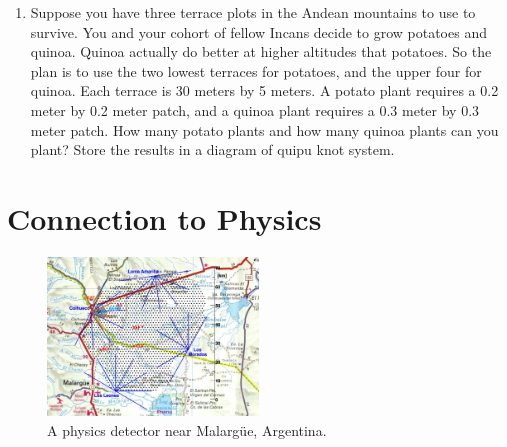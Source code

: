 \documentclass[10pt]{article}
\begin{document}
\begin{enumerate}
\item Suppose you have three terrace plots in the Andean mountains to use to survive.  You and your cohort of fellow Incans decide to grow potatoes and quinoa. Quinoa actually do better at higher altitudes that potatoes.  So the plan is to use the two lowest terraces for potatoes, and the upper four for quinoa.  Each terrace is 30 meters by 5 meters.  A potato plant requires a 0.2 meter by 0.2 meter patch, and a quinoa plant requires a 0.3 meter by 0.3 meter patch.  How many potato plants and how many quinoa plants can you plant? Store the results in a diagram of quipu knot system. \\ \vspace{2.5cm}
\end{enumerate}

\section{Connection to Physics}

\begin{figure}
\centering
\includegraphics[width=0.5\textwidth]{figures/pao.jpg}
\caption{\label{fig:auger} A physics detector near Malarg\"{u}e, Argentina.}
\end{figure}
\end{document}
